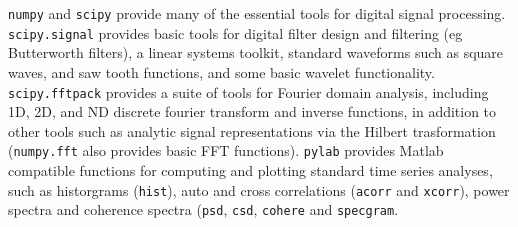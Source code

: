 \texttt{numpy} and \texttt{scipy} provide many of the essential tools
for digital signal processing.  \texttt{scipy.signal} provides basic
tools for digital filter design and filtering (eg Butterworth
filters), a linear systems toolkit, standard waveforms such as square
waves, and saw tooth functions, and some basic wavelet functionality.
\texttt{scipy.fftpack} provides a suite of tools for Fourier domain
analysis, including 1D, 2D, and ND discrete fourier transform and
inverse functions, in addition to other tools such as analytic signal
representations via the Hilbert trasformation (\texttt{numpy.fft} also
provides basic FFT functions).  \texttt{pylab} provides Matlab
compatible functions for computing and plotting standard time series
analyses, such as historgrams (\texttt{hist}), auto and cross
correlations (\texttt{acorr} and \texttt{xcorr}), power spectra and
coherence spectra (\texttt{psd}, \texttt{csd}, \texttt{cohere} and
\texttt{specgram}.  
